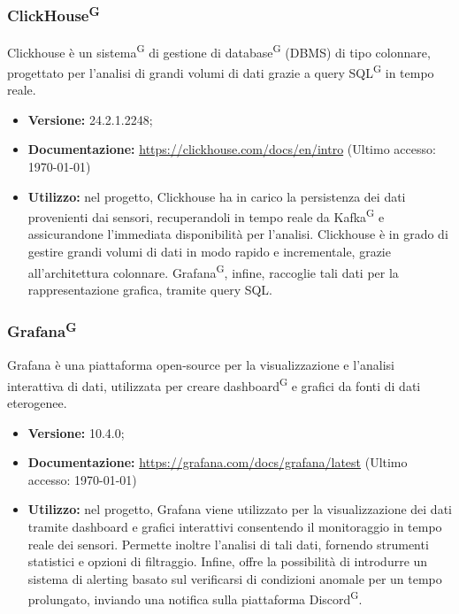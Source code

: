 \documentclass[8pt]{article}
\newcommand{\glossterm}[1]{#1\textsuperscript{G}} %
\begin{document}
\subsubsection{\glossterm{ClickHouse}}
Clickhouse è un \glossterm{sistema} di gestione di \glossterm{database} (DBMS) di tipo colonnare,
progettato per l’analisi di grandi volumi di dati grazie a query \glossterm{SQL} in tempo reale.
\begin{itemize}
	\setlength\itemsep{0em}
    \item \textbf{Versione:} 24.2.1.2248;
    \item \textbf{Documentazione:} \href{https://clickhouse.com/docs/en/intro}{\color{myblue}https://clickhouse.com/docs/en/intro} (Ultimo accesso: \today)
    \item \textbf{Utilizzo:} nel progetto, Clickhouse ha in carico la persistenza dei dati provenienti dai sensori, recuperandoli in tempo reale da \glossterm{Kafka} e assicurandone l'immediata disponibilità per l’analisi.
    Clickhouse è in grado di gestire grandi volumi di dati in modo rapido e incrementale, grazie all'architettura colonnare.
    \glossterm{Grafana}, infine, raccoglie tali dati per la rappresentazione grafica, tramite query SQL.
\end{itemize}
\subsubsection{\glossterm{Grafana}}
Grafana è una piattaforma open-source per la visualizzazione e l'analisi interattiva di dati, utilizzata per creare \glossterm{dashboard} e grafici da fonti di dati eterogenee.
\begin{itemize}
	\setlength\itemsep{0em}
    \item \textbf{Versione:} 10.4.0;
    \item \textbf{Documentazione:} \href{https://grafana.com/docs/grafana/latest}{\color{myblue}https://grafana.com/docs/grafana/latest} (Ultimo accesso: \today)
    \item \textbf{Utilizzo:} nel progetto, Grafana viene utilizzato per la visualizzazione dei dati tramite dashboard e grafici interattivi consentendo il monitoraggio in tempo reale dei sensori.
    Permette inoltre l'analisi di tali dati, fornendo strumenti statistici e opzioni di filtraggio. Infine, offre la possibilità di introdurre un sistema di alerting basato sul verificarsi di condizioni anomale per un tempo prolungato, inviando una notifica sulla piattaforma \glossterm{Discord}.
\end{itemize}
\newpage
\end{document}
